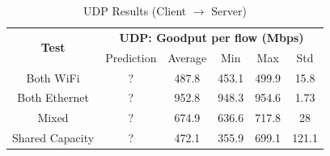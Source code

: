         \begin{table}
            \small
            \centering
            \begin{tabular}{|ll|lllll|}
            \hline
            \multicolumn{2}{|c|}{\multirow{2}{*}{\textbf{Test}}} & 
                \multicolumn{5}{c|}{\textbf{UDP: Goodput per flow (Mbps)}} \\
            \cline{3-7}
            \multicolumn{2}{|c|}{} &
                \multicolumn{1}{c|}{Prediction} &
                \multicolumn{1}{c|}{Average} &
                \multicolumn{1}{c|}{Min} &
                \multicolumn{1}{c|}{Max} &
                \multicolumn{1}{c|}{Std} \\
            \hline
            \multicolumn{2}{|c|}{Both WiFi} &
                \multicolumn{1}{c|}{?} &
                \multicolumn{1}{c|}{487.8} &
                \multicolumn{1}{c|}{453.1} &
                \multicolumn{1}{c|}{499.9} &
                \multicolumn{1}{c|}{15.8} \\
            \hline
            \multicolumn{2}{|c|}{Both Ethernet} &
                \multicolumn{1}{c|}{?} &
                \multicolumn{1}{c|}{952.8} &
                \multicolumn{1}{c|}{948.3} &
                \multicolumn{1}{c|}{954.6} &
                \multicolumn{1}{c|}{1.73} \\
            \hline
            \multicolumn{2}{|c|}{Mixed} &
                \multicolumn{1}{c|}{?} &
                \multicolumn{1}{c|}{674.9} &
                \multicolumn{1}{c|}{636.6} &
                \multicolumn{1}{c|}{717.8} &
                \multicolumn{1}{c|}{28} \\
            \hline
            \multicolumn{2}{|c|}{Shared Capacity} &
                \multicolumn{1}{c|}{?} &
                \multicolumn{1}{c|}{472.1} &
                \multicolumn{1}{c|}{355.9} &
                \multicolumn{1}{c|}{699.1} &
                \multicolumn{1}{c|}{121.1} \\
            \hline
            \end{tabular}
            \vspace{0.5cm}
            \caption{UDP Results (Client $\rightarrow$ Server)}
            \label{tab:udp-results}
        \end{table}

